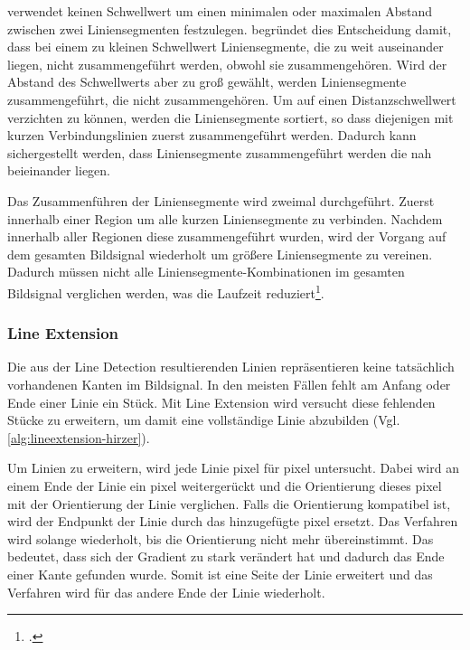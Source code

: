 \citeauthor{hirzer08} verwendet keinen Schwellwert um einen minimalen oder maximalen Abstand zwischen zwei
 Liniensegmenten festzulegen. \citeauthor{hirzer08} begründet dies Entscheidung damit, dass bei einem zu kleinen
 Schwellwert Liniensegmente, die zu weit auseinander liegen, nicht zusammengeführt werden, obwohl sie zusammengehören.
 Wird der Abstand des Schwellwerts aber zu groß gewählt, werden Liniensegmente zusammengeführt, die nicht
 zusammengehören. Um auf einen Distanzschwellwert verzichten zu können, werden die Liniensegmente sortiert, so dass
 diejenigen mit kurzen Verbindungslinien zuerst zusammengeführt werden. Dadurch kann sichergestellt werden, dass
 Liniensegmente zusammengeführt werden die nah beieinander liegen.

Das Zusammenführen der Liniensegmente wird zweimal durchgeführt. Zuerst innerhalb einer Region um alle kurzen
 Liniensegmente zu verbinden. Nachdem innerhalb aller Regionen diese zusammengeführt wurden, wird der Vorgang auf dem
 gesamten Bildsignal wiederholt um größere Liniensegmente zu vereinen. Dadurch müssen nicht alle
 Liniensegmente-Kombinationen im gesamten Bildsignal verglichen werden, was die Laufzeit
 reduziert\footcite[Vgl.][S.~10]{hirzer08}.


\subsubsection{Line Extension} %
\label{sub:line_extension}



Die aus der Line Detection resultierenden Linien repräsentieren keine tatsächlich vorhandenen Kanten im Bildsignal. In
 den meisten Fällen fehlt am Anfang oder Ende einer Linie ein Stück. Mit Line Extension wird versucht diese fehlenden
 Stücke zu erweitern, um damit eine vollständige Linie abzubilden (Vgl. \autoref{alg:lineextension-hirzer}).

Um Linien zu erweitern, wird jede Linie \gls{pixel} für \gls{pixel} untersucht. Dabei wird an einem Ende der Linie
 ein \gls{pixel} weitergerückt und die Orientierung dieses \gls{pixel} mit der Orientierung der Linie verglichen. Falls
 die Orientierung kompatibel ist, wird der Endpunkt der Linie durch das hinzugefügte \gls{pixel} ersetzt. Das Verfahren
 wird solange wiederholt, bis die Orientierung nicht mehr übereinstimmt. Das bedeutet, dass sich der Gradient zu stark
 verändert hat und dadurch das Ende einer Kante gefunden wurde. Somit ist eine Seite der Linie erweitert und das
 Verfahren wird für das andere Ende der Linie wiederholt.

